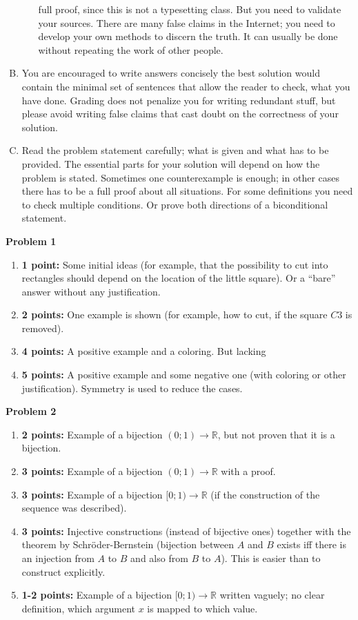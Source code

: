 \documentclass[jou]{apa6}
\begin{document}
\begin{enumerate}[(A)]
\begin{itemize}
full proof, since this is not a typesetting class. But you need to 
validate your sources. There are many false claims in the Internet; 
you need to develop your own methods to discern the truth. It can 
usually be done without repeating the work of other people.
\end{itemize}
\item You are encouraged to write answers concisely \textendash{} the best solution would contain the 
minimal set of sentences that allow the reader to check, what you have done. 
Grading does not penalize you for writing redundant stuff, but
please avoid writing false claims that cast doubt on the correctness of your solution.
\item Read the problem statement carefully; what is given and what has to be provided. 
The essential parts for your solution will depend on how the problem is stated.
Sometimes one counterexample is enough; in other cases there has to be a full proof about all 
situations. For some definitions you need to check multiple conditions. 
Or prove both directions of a biconditional statement.
\end{enumerate}




\vspace{2ex}
{\bf Problem 1} 
\begin{enumerate}
\item {\bf 1 point:} Some initial ideas (for example, that the possibility to cut into 
rectangles should depend on the location of the little square). Or a ``bare'' answer without
any justification. 
\item {\bf 2 points:} One example is shown (for example, how to cut, if the square $C3$ is removed).
\item {\bf 4 points:} A positive example and a coloring. But lacking 
\item {\bf 5 points:} A positive example and some negative one (with coloring or other justification). 
Symmetry is used to reduce the cases. 
\end{enumerate}


\vspace{2ex}
{\bf Problem 2} 
\begin{enumerate}
\item {\bf 2 points:} Example of a bijection $(0;1) \rightarrow \mathbb{R}$, but not proven that it is a bijection.
\item {\bf 3 points:} Example of a bijection $(0;1) \rightarrow \mathbb{R}$ with a proof.
\item {\bf 3 points:} Example of a bijection $[0;1) \rightarrow \mathbb{R}$ (if the construction of the sequence was described).
\item {\bf 3 points:} Injective constructions (instead of bijective ones) together with 
the theorem by Schr\"{o}der-Bernstein (bijection between $A$ and $B$ exists
iff there is an injection from $A$ to $B$ and also from $B$ to $A$). This is easier than to construct explicitly.
\item {\bf 1-2 points:} Example of a bijection $[0;1) \rightarrow \mathbb{R}$ written vaguely; no clear definition, which argument $x$ is mapped to which value.
\end{enumerate}
\end{document}
